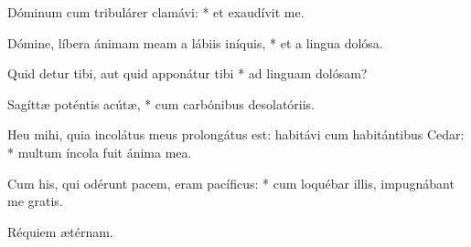 \begin{psalmus}

 Dóminum cum tribulárer clamávi: * et exaudívit me.

Dómine, líbera ánimam meam a lábiis iníquis, * et a lingua dolósa.

Quid detur tibi, aut quid apponátur tibi * ad linguam dolósam?

Sagíttæ poténtis acútæ, * cum carbónibus desolatóriis.

Heu mihi, quia incolátus meus prolongátus est: habitávi cum habitántibus Cedar: * multum íncola fuit ánima mea.

Cum his, qui odérunt pacem, eram pacíficus: * cum loquébar illis, impugnábant me gratis.

Réquiem ætérnam.

\end{psalmus}

